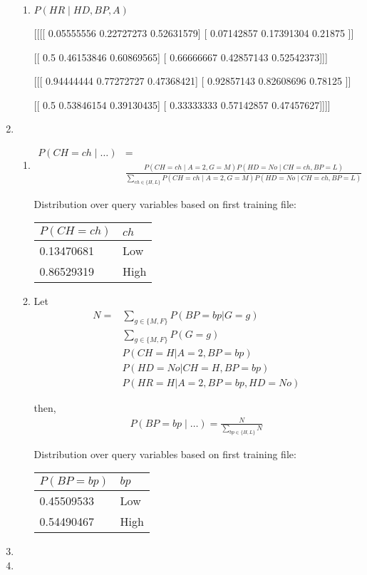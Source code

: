 \documentclass[12pt]{article}
\begin{document}
\begin{enumerate}
\begin{enumerate}
\item
$P(HR\mid HD,BP,A)$

[[[[ 0.05555556  0.22727273  0.52631579]
   [ 0.07142857  0.17391304  0.21875   ]]

  [[ 0.5         0.46153846  0.60869565]
   [ 0.66666667  0.42857143  0.52542373]]]


 [[[ 0.94444444  0.77272727  0.47368421]
   [ 0.92857143  0.82608696  0.78125   ]]

  [[ 0.5         0.53846154  0.39130435]
   [ 0.33333333  0.57142857  0.47457627]]]]
\end{enumerate}

\item %
\begin{enumerate}
\item

\begin{align*}
P(CH=ch\mid \ldots) &= \\
&\frac{P(CH=ch\mid A=2,G=M)P(HD=No\mid CH=ch,BP=L)}{\sum_{ch \in \{H,L\}}P(CH=ch\mid A=2,G=M)P(HD=No\mid CH=ch,BP=L)}
\end{align*}

Distribution over query variables based on first training file:

\begin{tabular}{ll}
$P(CH=ch)$ & $ch$ \\ \hline
0.13470681 & Low \\
0.86529319 & High
\end{tabular}

\item
Let
\begin{align*}
N = &\sum_{g \in \{M,F\}}P(BP=bp|G=g)\\
&\sum_{g \in \{M,F\}}P(G=g)\\
&P(CH=H|A=2,BP=bp)\\
&P(HD=No|CH=H,BP=bp)\\
&P(HR=H|A=2,BP=bp,HD=No)
\end{align*}

then,
\begin{align*}
P(BP=bp\mid \ldots) = \frac{N}{\sum_{bp\in\{H,L\}}N}
\end{align*}

Distribution over query variables based on first training file:

\begin{tabular}{ll}
$P(BP=bp)$ & $bp$ \\ \hline
0.45509533 & Low \\
0.54490467 & High
\end{tabular}

\end{enumerate}

\item %

\item %

\end{enumerate}
\end{document}
